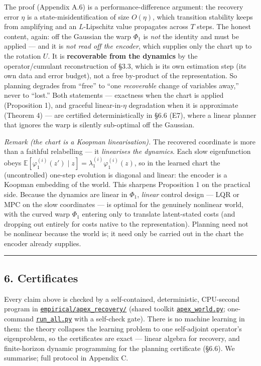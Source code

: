 \documentclass[
  letterpaper,
  11pt]{article}
\theoremstyle{plain}
\theoremstyle{definition}
\theoremstyle{remark}
\begin{document}
The proof (Appendix A.6) is a performance-difference argument: the recovery error \(\eta\) is a state-misidentification of size \(O(\eta)\), which transition stability keeps from amplifying and an \(L\)-Lipschitz value propagates across \(T\) steps. The honest content, again: off the Gaussian the warp \(\Phi_1\) is \emph{not} the identity and must be applied --- and it is \emph{not read off the encoder}, which supplies only the chart up to the rotation \(U\). It is \textbf{recoverable from the dynamics} by the operator/cumulant reconstruction of §3.3, which is its own estimation step (its own data and error budget), not a free by-product of the representation. So planning degrades from ``free'' to ``one \emph{recoverable} change of variables away,'' never to ``lost.'' Both statements --- exactness when the chart is applied (Proposition 1), and graceful linear-in-\(\eta\) degradation when it is approximate (Theorem 4) --- are certified deterministically in §6.6 (E7), where a linear planner that ignores the warp is silently sub-optimal off the Gaussian.

\emph{Remark (the chart is a Koopman linearisation).} The recovered coordinate is more than a faithful relabelling --- it \emph{linearises the dynamics}. Each slow eigenfunction obeys \(\mathbb{E}[\varphi_1^{(i)}(z')\mid z]=\lambda_1^{(i)}\varphi_1^{(i)}(z)\), so in the learned chart the (uncontrolled) one-step evolution is diagonal and linear: the encoder is a Koopman embedding of the world. This sharpens Proposition 1 on the practical side. Because the dynamics are linear in \(\Phi_1\), \emph{linear} control design --- LQR or MPC on the slow coordinates --- is optimal for the genuinely nonlinear world, with the curved warp \(\Phi_1\) entering only to translate latent-stated costs (and dropping out entirely for costs native to the representation). Planning need not be nonlinear because the world is; it need only be carried out in the chart the encoder already supplies.

\begin{center}\rule{0.5\linewidth}{0.5pt}\end{center}

\subsection{6. Certificates}\label{sec:experiments}

Every claim above is checked by a self-contained, deterministic, CPU-second program in \href{https://github.com/leomurillo/AI-ConductorBlindSpot/tree/main/empirical/apex_recovery}{\texttt{empirical/apex\_recovery/}} (shared toolkit \href{https://github.com/leomurillo/AI-ConductorBlindSpot/blob/main/empirical/apex_recovery/apex_world.py}{\texttt{apex\_world.py}}; one-command \href{https://github.com/leomurillo/AI-ConductorBlindSpot/blob/main/empirical/apex_recovery/run_all.py}{\texttt{run\_all.py}} with a self-check gate). There is no machine learning in them: the theory collapses the learning problem to one self-adjoint operator's eigenproblem, so the certificates are exact --- linear algebra for recovery, and finite-horizon dynamic programming for the planning certificate (§6.6). We summarise; full protocol in Appendix C.
\end{document}
